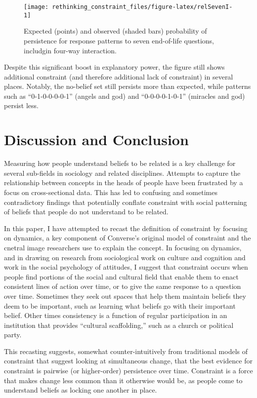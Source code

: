 \documentclass[12pt,]{article}
\begin{document}
\begin{figure}[t]
\texttt{[image: rethinking\_constraint\_files/figure-latex/relSevenI-1]} \caption{Expected (points) and observed (shaded bars) probability of persistence for response patterns to seven end-of-life questions, includgin four-way interaction.}\label{fig:relSevenI}
\end{figure}

Despite this significant boost in explanatory power, the figure still shows additional constraint (and therefore additional lack of constraint) in several places. Notably, the no-belief set still persists more than expected, while patterns such as ``0-1-0-0-0-0-1'' (angels and god) and ``0-0-0-0-1-0-1'' (miracles and god) persist less.

\hypertarget{discussion-and-conclusion}{%
\section{Discussion and Conclusion}\label{discussion-and-conclusion}}

Measuring how people understand beliefs to be related is a key challenge for several sub-fields in sociology and related disciplines. Attempts to capture the relationship between concepts in the heads of people have been frustrated by a focus on cross-sectional data. This has led to confusing and sometimes contradictory findings that potentially conflate constraint with social patterning of beliefs that people do not understand to be related.

In this paper, I have attempted to recast the definition of constraint by focusing on dynamics, a key component of Converse's original model of constraint and the cnetral image researchers use to explain the concept. In focusing on dynamics, and in drawing on research from sociological work on culture and cognition and work in the social psychology of attitudes, I suggest that constraint occurs when people find portions of the social and cultural field that enable them to enact consistent lines of action over time, or to give the same response to a question over time. Sometimes they seek out spaces that help them maintain beliefs they deem to be important, such as learning what beliefs go with their important belief. Other times consistency is a function of regular participation in an institution that provides ``cultural scaffolding,'' such as a church or political party.

This recasting suggests, somewhat counter-intuitively from traditional models of constraint that suggest looking at simultaneous change, that the best evidence for constraint is pairwise (or higher-order) persistence over time. Constraint is a force that makes change less common than it otherwise would be, as people come to understand beliefs as locking one another in place.
\end{document}

